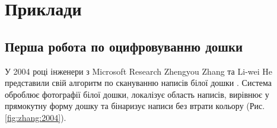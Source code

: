 \section{Приклади}

\vspace{-\baselineskip}

\subsection{Перша робота по оцифровуванню дошки}

У 2004 році інженери з Microsoft Research Zhengyou Zhang
та Li-wei He представили свій алгоритм по скануванню написів
білої дошки \cite{zhang:2004}. Система оброблює фотографії білої дошки, локалізує область
написів, вирівнює у прямокутну форму дошку та бінаризує написи без втрати
кольору (Рис. \ref{fig:zhang:2004}).
